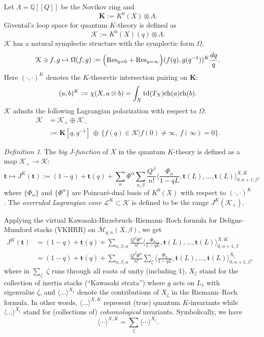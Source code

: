 \documentclass[11pt]{amsart}
\newtheorem*{main theorem*}{Main Theorem}
\theoremstyle{remark}
\newtheorem{definition}[theorem]{Definition}
\numberwithin{equation}{section}
\newcommand{\M}{\overline{\mathcal{M}}}
\newcommand{\K}{\mathcal{K}}
\newcommand{\Res}{{\rm Res}}
\newcommand{\td}{{\rm td}}
\newcommand{\ch}{{\rm ch}}
\newcommand{\KK}{{K}}
\begin{document}
Let $\Lambda = \mathbb{Q}[\![Q]\!]$ be the Novikov ring and 
\[
 \mathbf{K} := K^0(X)\otimes \Lambda.
\]
Givental's loop space for quantum $K$-theory is defined as
\[
\K := K^0(X)(q) \otimes \Lambda.
\]
$\K$ has a natural symplectic structure with the symplectic form $\Omega$,
\[
\K \ni f,g \mapsto \Omega(f,g) := \Big( \Res_{q=0} + \Res_{q=\infty} \Big) ( f(q), g(q^{-1}) )^{K} \frac{dq}{q}.
\]
Here $( \cdot, \cdot )^{K}$ denotes the $K$-theoretic intersection pairing on $\mathbf{K}$:
\[
(a,b)^{K} := \chi(X, a \otimes b) = \int_X \td (T_X) \ch(a) \ch(b).
\]
$\K$ admits the following Lagrangian polarization with respect to $\Omega$:
\[
\begin{split}
    \K &= \K_+ \oplus \K_-
    \\
    & := \mathbf{K}[q,q^{-1}] \, \oplus \, \{ f(q) \in \K | f(0) \neq \infty ,\ f(\infty) =0 \}.
\end{split}
\]
\begin{definition}\label{def:KbigJ}
The \emph{big $J$-function} of $X$ in the quantum $K$-theory is defined as a map $\K_+ \rightarrow \K$:
\[
   \mathbf{t} \mapsto J^{\KK}(\mathbf{t}) := (1-q) + \mathbf{t}(q) + \sum_{\alpha} \Phi^{\alpha}\sum_{n,\beta} \frac{Q^{\beta}}{n!} \langle \frac{\Phi_{\alpha}}{1-qL}, \mathbf{t}(L),\dots, \mathbf{t}(L) \rangle ^{X,K}_{0,n+1,\beta},
\]
where $\{ \Phi_{\alpha} \}$ and $\{\Phi^{\alpha}\}$ are Poincar\'e-dual basis of $K^0(X)$ with respect to $( \cdot, \cdot )^{K}$. 
The  \emph{overruled Lagrangian cone} $\mathcal{L}^K \subset \mathcal{K}$ is defined to be the range $J^K (\K_+)$. 
\end{definition}

Applying the virtual Kawasaki-Hirzebruch--Riemann--Roch formula for Deligne--Mumford stacks (VKHRR) \cite{Tonita_VKHRR} on $\M_{g,n}(X,\beta)$, we get  
\[  \begin{split}
J^{\KK}(\mathbf{t}) &=(1-q) + \mathbf{t}(q) + \sum_{n,\beta,\alpha} \frac{Q^{\beta} \Phi^{\alpha}}{n!}\langle \frac{\Phi_{\alpha}}{1-qL}, \mathbf{t}(L),\dots, \mathbf{t}(L)  \rangle^{X,K}_{0,n+1,\beta}
\\
&= (1-q) + \mathbf{t}(q) + \sum_{n,\beta,\alpha} \frac{Q^{\beta} \Phi^{\alpha}}{n!}\sum_{\zeta} \langle \frac{\Phi_{\alpha}}{1-qL}, \mathbf{t}(L),\dots,\mathbf{t}(L)  \rangle^{X_{\zeta}}_{0,n+1,\beta},
\end{split}\]
where in $\sum_{\zeta}$ $\zeta$ runs through all roots of unity (including 1), $X_{\zeta}$ stand for the collection of inertia stacks (``Kawasaki strata'') where $g$ acts on $L_1$ with eigenvalue $\zeta$, and $\langle ... \rangle^{X_{\zeta}}$ denote the contributions of $X_{\zeta}$ in the Riemann--Roch formula. In other words, $\langle ...\rangle^{X,K}$ represent (true) quantum $K$-invariants while $\langle ... \rangle^{X_{\zeta}}$ stand for (collections of) \emph{cohomological} invariants. Symbolically, we have 
\[
\langle \cdots \rangle^{X,K} = \sum_{\zeta} \langle \cdots\rangle^{X_{\zeta}}.
\]
\end{document}
